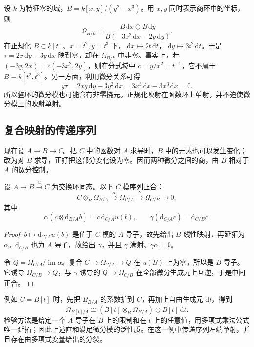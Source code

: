 \begin{example}\label{g5:exm:cusp-differential-torsion}
	设 \(k\) 为特征零的域，\(B=k[x,y]/(y^2-x^3)\)。用 \(x,y\) 同时表示商环中的坐标，则
	\[
		\Omega_{B/k}
		=\frac{B\,\mathrm{d}x\oplus B\,\mathrm{d}y}
		{B(-3x^2\,\mathrm{d}x+2y\,\mathrm{d}y)}.
	\]
	在正规化 \(B\subset k[t]\)、\(x=t^2,y=t^3\) 下，
	\(\mathrm{d}x\mapsto2t\,\mathrm{d}t\)，
	\(\mathrm{d}y\mapsto3t^2\,\mathrm{d}t\)。于是
	\(\tau=2x\,\mathrm{d}y-3y\,\mathrm{d}x\) 映到零，却在 \(\Omega_{B/k}\) 中非零。事实上，若
	\((-3y,2x)=c(-3x^2,2y)\)，则在分式域中
	\(c=y/x^2=t^{-1}\)，它不属于 \(B=k[t^2,t^3]\)。另一方面，利用微分关系可得
	\[
		y\tau=2xy\,\mathrm{d}y-3y^2\,\mathrm{d}x
		=3x^3\,\mathrm{d}x-3x^3\,\mathrm{d}x=0.
	\]
	所以整环的微分模也可能含有非零挠元。正规化映射在函数环上单射，并不迫使微分模上的映射单射。
\end{example}

\subsection{复合映射的传递序列}
\label{g5:subsec:0502:02}

现在设 \(A\to B\to C\)。把 \(C\) 中的函数对 \(A\) 求导时，\(B\) 中的元素也可以发生变化；改为对 \(B\) 求导，正好把这部分变化设为零。因而两种微分之间的商，由 \(B\) 相对于 \(A\) 的微分控制。

\begin{theorem}[传递正合列]\label{g5:thm:transitivity-sequence}
	设 \(A\to B\xrightarrow{u}C\) 为交换环同态。以下 \(C\) 模序列正合：
	\[
		C\otimes_B\Omega_{B/A}\xrightarrow{\alpha}
		\Omega_{C/A}\xrightarrow{\gamma}
		\Omega_{C/B}\longrightarrow0,
	\]
	其中
	\[
		\alpha(c\otimes\mathrm{d}_{B/A}b)=c\,\mathrm{d}_{C/A}u(b),
		\qquad
		\gamma(\mathrm{d}_{C/A}c)=\mathrm{d}_{C/B}c.
	\]
\end{theorem}
\begin{proof}
	\(b\mapsto\mathrm{d}_{C/A}u(b)\) 是值于 \(C\) 模的 \(A\) 导子，故先给出 \(B\) 线性映射，再延拓为 \(\alpha\)。\(\mathrm{d}_{C/B}\) 也为 \(A\) 导子，故给出 \(\gamma\)，并且 \(\gamma\) 满射、\(\gamma\alpha=0\)。

	令 \(Q=\Omega_{C/A}/\operatorname{im}\alpha\)。复合 \(C\to\Omega_{C/A}\to Q\) 在 \(u(B)\) 上为零，所以是 \(B\) 导子。它诱导 \(\Omega_{C/B}\to Q\)，与 \(\gamma\) 诱导的 \(Q\to\Omega_{C/B}\) 在全部微分生成元上互逆。于是中间正合。
\end{proof}

例如 \(C=B[t]\) 时，先把 \(\Omega_{B/A}\) 的系数扩到 \(C\)，再加上自由生成元 \(\mathrm{d}t\)，得到
\[
	\Omega_{B[t]/A}\cong
	(B[t]\otimes_B\Omega_{B/A})\oplus B[t]\,\mathrm{d}t.
\]
检验方法是给定一个 \(A\) 导子在 \(B\) 上的限制和在 \(t\) 上的任意值，用多项式乘法公式唯一延拓；因此上述直和满足微分模的泛性质。在这一例中传递序列左端单射，并且存在由多项式变量给出的分裂。


